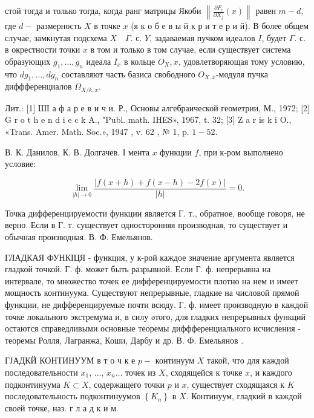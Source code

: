 \documentclass[10pt]{article}
\begin{document}
стой тогда и только тогда, когда ранг матрицы Якоби $\left\|\frac{\partial F_{i}}{\partial X_{j}}(x)\right\|$ равен $m-d$, где $d-$ размерность $X$ в точке $x$ (я к о б е в ы й к р и т е р и й). В более общем случае, замкнутая подсхема $X \quad \Gamma$. с. $Y$, задаваемая пучком идеалов $I$, будет $\Gamma$. с. в окрестности точки $x$ в том и только в том случае, если существует система образующих $g_{1}, \ldots, g_{n}$ идеала $I_{x}$ в кольце $O_{X}, x$, удовлетворяющая тому условию, что $d g_{1}, \ldots, d g_{n}$ составляют часть базиса свободного $O_{X, x}$-модуля пучка диффференциалов $\Omega_{X / k, x}$.



Лит.: [1] ШІ а ф а р е в и ч и. Р., Основы алгебраической геометрии, М., 1972; [2] G r o t h e n d i e c k A., "Publ. math. IHES», 1967, t. 32; [3] Z a r is k i O., «Trans. Amer. Math. Soc.», 1947 , v. 62 , № 1, p. $1-52$.



В. К. Данилов, К. В. Долгачев. І мента $x$ функции $f$, при к-ром выполнено условие:



\[

\lim _{|h| \rightarrow 0} \frac{|f(x+h)+f(x-h)-2 f(x)|}{|h|}=0 .

\]



Точка дифференцируемости функции является Г. т., обратное, вообще говоря, не верно. Если в Г. т. существует односторонняя производная, то существует и обычная производная. В. Ф. Емельянов.



ГЛАДКАЯ ФУНКІЦЯ - функция, у к-рой каждое значение аргумента является гладкой точкой. Г. ф. может быть разрывной. Если Г. ф. непрерывна на интервале, то множество точек ее дифференцируемости плотно на нем и имеет мощность континуума. Существуют непрерывные, гладкие на числовой прямой функции, не дифференцируемые почти всюду. Г. ф. имеет производную в каждой точке локального экстремума и, в силу әтого, для гладких непрерывных функций остаются справедливыми основные теоремы диффференциального исчисления - теоремы Ролля, Лагранжа, Коши, Дарбу и др. В. Ф. Емельянов .



ГЈАДКЙ КОНТИНУУМ в т о ч к е $p-$ континуум $X$ такой, что для каждой последовательности $x_{1}$, ..., $x_{n} \ldots$ точек из $X$, сходящейся к точке $x$, и каждого подконтинуума $K \subset X$, содержащего точки $p$ и $x$, существует сходящаяся к $K$ последовательность подконтинуумов $\left\{K_{n}\right\}$ в $X$. Континуум, гладкий в каждой своей точке, наз. г л а д к и м.
\end{document}
